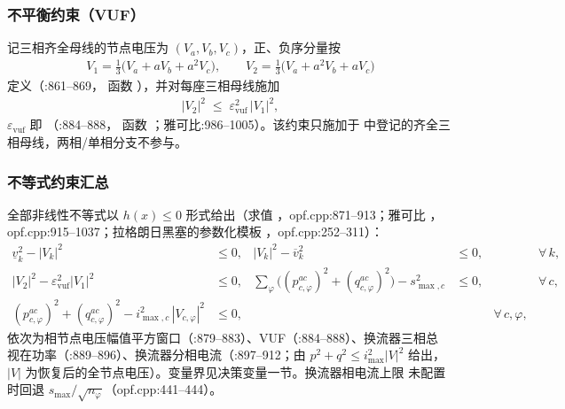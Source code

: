 \subsubsection*{不平衡约束（VUF）}
记三相齐全母线的节点电压为 $(V_a,V_b,V_c)$，正、负序分量按
\begin{align*}
V_1 = \tfrac{1}{3}\bigl(V_a + aV_b + a^{2}V_c\bigr),\qquad
V_2 = \tfrac{1}{3}\bigl(V_a + a^{2}V_b + aV_c\bigr)
\end{align*}
定义（:861--869，
函数 ），并对每座三相母线施加
\begin{align*}
|V_2|^{2} \;\le\; \varepsilon_{\mathrm{vuf}}^{2}\,|V_1|^{2},
\end{align*}
$\varepsilon_{\mathrm{vuf}}$ 即 （:884--888，
函数 ；雅可比:986--1005）。该约束只施加于
 中登记的齐全三相母线，两相/单相分支不参与。

\subsubsection*{不等式约束汇总}
全部非线性不等式以 $h(x)\le 0$ 形式给出（求值
，opf.cpp:871--913；雅可比
，opf.cpp:915--1037；拉格朗日黑塞的参数化模板
，opf.cpp:252--311）：
\begin{align*}
\underline{v}_k^{2} - |V_k|^{2} &\le 0, &
|V_k|^{2} - \overline{v}_k^{2} &\le 0, &
&\forall\,k,\\
|V_2|^{2} - \varepsilon_{\mathrm{vuf}}^{2}|V_1|^{2} &\le 0, &
\sum_{\varphi}\bigl((p^{ac}_{c,\varphi})^{2}+(q^{ac}_{c,\varphi})^{2}\bigr) - s_{\max,c}^{2} &\le 0, &
&\forall\,c,\\
(p^{ac}_{c,\varphi})^{2}+(q^{ac}_{c,\varphi})^{2}
  - i_{\max,c}^{2}\,|V_{c,\varphi}|^{2} &\le 0, &
& &\forall\,c,\varphi,
\end{align*}
依次为相节点电压幅值平方窗口（:879--883）、VUF（:884--888）、换流器三相总
视在功率（:889--896）、换流器分相电流（:897--912；由 $p^2+q^2\le i_{\max}^2|V|^2$
给出，$|V|$ 为恢复后的全节点电压）。变量界见决策变量一节。换流器相电流上限
未配置时回退 $s_{\max}/\sqrt{n_{\varphi}}$（opf.cpp:441--444）。

